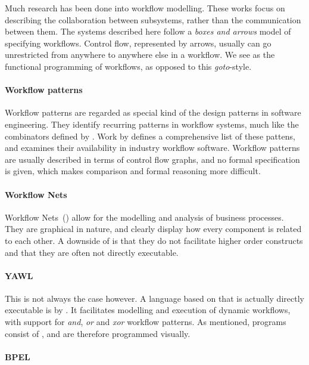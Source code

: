 Much research has been done into workflow modelling. These works focus on
describing the collaboration between subsystems, rather than the communication
between them.
The systems described here follow a \emph{boxes and arrows} model of specifying workflows.
Control flow, represented by arrows, usually can go unrestricted from anywhere to anywhere else in a workflow.
We see \TOP as the functional programming of workflows, as opposed to this \emph{goto}-style.


\paragraph{Workflow patterns}

Workflow patterns are regarded as special kind of the design patterns in
software engineering. They identify recurring patterns in workflow systems, much
like the combinators defined by \TOPHAT. Work by \citet{journals/dpd/AalstHKB03}
defines a comprehensive list of these
pattens, and examines their availability in industry workflow software.
Workflow patterns are usually described in terms of control flow graphs, and no
formal specification is given, which makes comparison and formal reasoning more
difficult.

\paragraph{Workflow Nets}

Workflow Nets~(\WFN)\cite{journals/jcsc/Aalst98} allow for the modelling and analysis
of business processes. They are graphical in nature, and clearly display how
every component is related to each other. A downside of \WFN is that
they do not facilitate higher order constructs and that they are often not
directly executable.

\paragraph{YAWL}

This is not always the case however. A language based on \WFN that is
actually directly executable is \YAWL by \citet{DBLP:journals/is/AalstH05}.
It facilitates modelling and execution of
dynamic workflows, with support for \emph{and}, \emph{or} and \emph{xor} workflow patterns. As
mentioned, \YAWL programs consist of \WFN, and are therefore programmed
visually.

\paragraph{BPEL}


